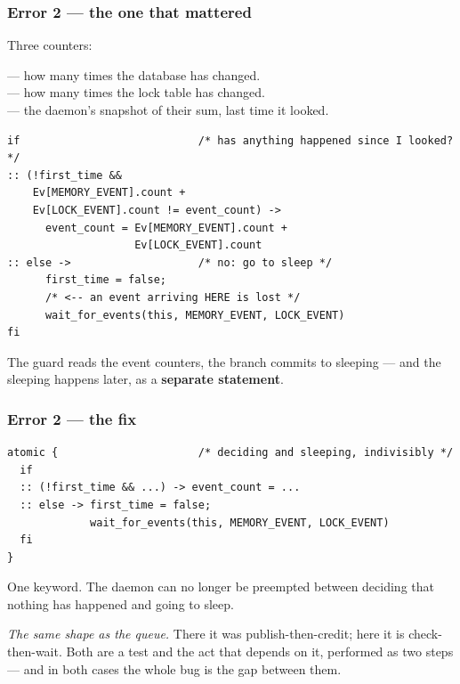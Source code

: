 \begin{frame}[fragile]
  \frametitle{Error 2 --- the one that mattered} \small

Three counters:

\vspace{0.1cm}

{\scriptsize
{} --- how many times the database has changed.\\
 --- how many times the lock table has changed.\\
 --- the daemon's snapshot of their sum, last time it looked.\par}

\begin{lstlisting}[language=promela]
if                            /* has anything happened since I looked? */
:: (!first_time &&
    Ev[MEMORY_EVENT].count +
    Ev[LOCK_EVENT].count != event_count) ->
      event_count = Ev[MEMORY_EVENT].count +
                    Ev[LOCK_EVENT].count
:: else ->                    /* no: go to sleep */
      first_time = false;
      /* <-- an event arriving HERE is lost */
      wait_for_events(this, MEMORY_EVENT, LOCK_EVENT)
fi
\end{lstlisting}

\pause

The guard reads the event counters, the  branch commits to
sleeping --- and the sleeping happens later, as a {\bf separate statement}.

\end{frame}

\begin{frame}[fragile]
  \frametitle{Error 2 --- the fix} \small

\begin{lstlisting}[language=promela]
atomic {                      /* deciding and sleeping, indivisibly */
  if
  :: (!first_time && ...) -> event_count = ...
  :: else -> first_time = false;
             wait_for_events(this, MEMORY_EVENT, LOCK_EVENT)
  fi
}
\end{lstlisting}

\vspace{0.15cm}

One keyword. The daemon can no longer be preempted between deciding that nothing
has happened and going to sleep.

\pause
\vspace{0.3cm}

\begin{block}{}\small
{\em The same shape as the queue.} There it was publish-then-credit; here it is
check-then-wait. Both are a test and the act that depends on it, performed as two
steps --- and in both cases the whole bug is the gap between them.
\end{block}

\end{frame}

